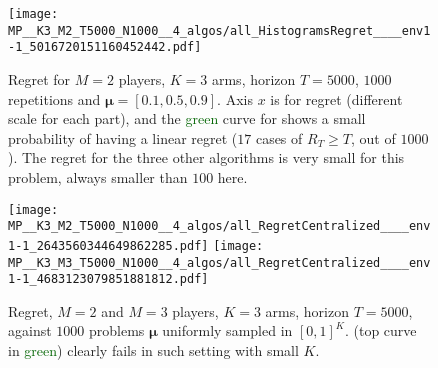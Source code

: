 %
%
\begin{figure}[!h]
  \centering
      \texttt{[image: MP\_\_K3\_M2\_T5000\_N1000\_\_4\_algos/all\_HistogramsRegret\_\_\_\_env1-1\_5016720151160452442.pdf]}
  \caption[Failure case of \Selfish]{Regret for $M=2$ players, $K=3$ arms, horizon $T=5000$, $1000$ repetitions and $\boldsymbol{\mu} = [0.1, 0.5, 0.9]$. Axis $x$ is for regret (different scale for each part), and the \textcolor{darkgreen}{green} curve for \Selfish{} shows a small probability of having a linear regret ($17$ cases of $R_T \geq T$, out of $1000$). The regret for the three other algorithms is very small for this problem, always smaller than $100$ here.}
  \label{fig:5:selfish_fail1}
\end{figure}


%
%
\begin{figure}[!h]
  \centering
      \texttt{[image: MP\_\_K3\_M2\_T5000\_N1000\_\_4\_algos/all\_RegretCentralized\_\_\_\_env1-1\_2643560344649862285.pdf]}
      \texttt{[image: MP\_\_K3\_M3\_T5000\_N1000\_\_4\_algos/all\_RegretCentralized\_\_\_\_env1-1\_4683123079851881812.pdf]}
  \caption[Second failure case of \Selfish]{Regret, $M=2$ and $M=3$ players, $K=3$ arms, horizon $T=5000$, against $1000$ problems $\boldsymbol{\mu}$ uniformly sampled in $[0,1]^K$. \Selfish{} (top curve in \textcolor{darkgreen}{green}) clearly fails in such setting with small $K$.}
  \label{fig:5:selfish_fail2}
\end{figure}

